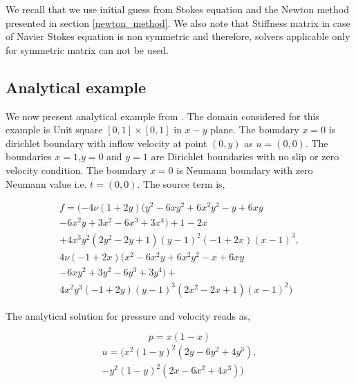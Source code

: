 \documentclass[a4paper]{book}
\begin{document}
We recall that we use initial guess from Stokes equation and the Newton method presented in section  \ref{newton_method}. We also note that Stiffness matrix in case of Navier Stokes equation is non symmetric and therefore, solvers applicable only for symmetric matrix can not be used. 

\subsection{Analytical example}

We now present analytical example from \cite{Montlaur}. The domain considered for this example is Unit square $[0,1] \times [0,1]$ in $x-y$ plane. 
The boundary ${x=0}$ is dirichlet boundary with inflow velocity at point $(0,y)$ as $u = (0, 0)$. The boundaries ${x = 1}$,${y = 0}$ and ${y = 1}$ are Dirichlet boundaries with no slip or zero velocity condition. The boundary ${x = 0}$ is Neumann boundary with zero Neumann value i.e. $t = (0, 0)$. The source term is,

\begin{equation}
\begin{split}
f = (-4 \nu (1+2y) (y^2 - 6xy^2 + 6x^2 y^2 - y + 6xy \\ - 6x^2 y + 3x^2 - 6x^3 + 3x^4)+ 1 - 2x \\+ 4x^3 y^2 (2y^2 - 2y + 1)(y - 1)^2 (-1 + 2x)(x - 1)^3,\\ 4 \nu (-1 + 2x)(x^2 - 6x^2 y + 6x^2 y^2 - x + 6xy \\ - 6xy^2 + 3y^2 - 6y^3 + 3y^4) + \\ 4x^2y^3 (-1+2y)(y-1)^3 (2x^2-2x+1)(x-1)^2)
\end{split}
\end{equation}
 
The analytical solution for pressure and velocity reads as,

\begin{center}
\begin{equation}
p = x(1 - x)
\end{equation}
\begin{equation} 
\begin{split}
u = (x^2(1-y)^2(2y-6y^2+4y^3),\\-y^2(1-y)^2(2x-6x^2+4x^3))
\end{split}
\end{equation}
\end{center}
\end{document}

